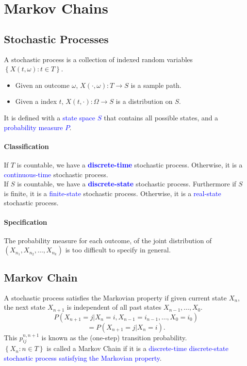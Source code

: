 \section{Markov Chains}
\subsection{Stochastic Processes}
A \textcolor{Bittersweet}{stochastic process} is a collection of indexed random
variables $\left\{ X(t,\omega) : t\in T\right\}$.
\begin{itemize}
  \item Given an outcome $\omega$, $X\left( \cdot,\omega \right) :T\to S$ is a sample path.
  \item Given a index $t$, $X\left( t,\cdot \right):\Omega\to S$ is a distribution on $S$.
\end{itemize}
It is defined with a \textcolor{Blue}{state space $S$} that contains all
possible states, and a \textcolor{Blue}{probability measure $P$}.
\paragraph{Classification}
If $T$ is countable, we have a \textcolor{Blue}{\textbf{discrete-time}} stochastic
process. Otherwise, it is a \textcolor{Blue}{continuous-time} stochastic
process.\\
If $S$ is countable, we have a \textcolor{Blue}{\textbf{discrete-state}} stochastic
process.  Furthermore if $S$ is finite, it is a \textcolor{Blue}{finite-state}
stochastic process.  Otherwise, it is a \textcolor{Blue}{real-state} stochastic
process.
\paragraph{Specification}
The probability measure for each outcome, of the joint distribution of
$\left(X_{n_1}, X_{n_2},\ldots,X_{n_k}\right)$ is too difficult to specify in
general.

\subsection{Markov Chain}
A stochastic process satisfies the \textcolor{Bittersweet}{Markovian property}
if given current state $X_{n}$, the next state $X_{n+1}$ is independent of all
past states $X_{n-1},\ldots,X_0$.
\[P\left( X_{n+1}=j|X_{n}=i,X_{n-1}=i_{n-1},\ldots,X_0=i_0 \right)\] \[=P\left(
X_{n+1}=j|X_{n}=i \right).\] 
This $p_{ij}^{n, n+1}$ is known as the \textcolor{Bittersweet}{(one-step)
transition probability}.\\
$\left\{ X_{n}:n\in T \right\}$ is called a \textcolor{Bittersweet}{Markov
Chain} if it is a \textcolor{Blue}{discrete-time discrete-state stochastic
process satisfying the Markovian property}.
